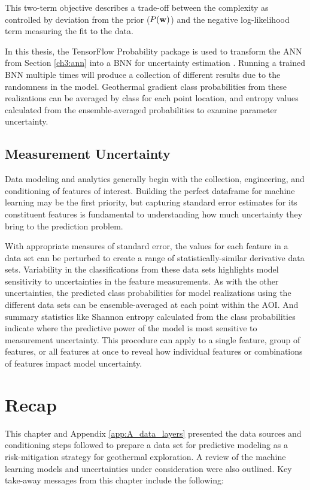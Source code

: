 This two-term objective describes a trade-off between the complexity as controlled by deviation from the prior ($P({\bf w})$) and the negative log-likelihood term measuring the fit to the data.

In this thesis, the TensorFlow Probability package is used to transform the ANN from Section \ref{ch3:ann} into a BNN for uncertainty estimation \citep{dillon_tensorflow_2017}. Running a trained BNN multiple times will produce a collection of different results due to the randomness in the model. Geothermal gradient class probabilities from these realizations can be averaged by class for each point location, and entropy values calculated from the ensemble-averaged probabilities to examine parameter uncertainty.

\subsection{Measurement Uncertainty}\label{ch3:measure_uncertainty}
Data modeling and analytics generally begin with the collection, engineering, and conditioning of features of interest. Building the perfect dataframe for machine learning may be the first priority, but capturing standard error estimates for its constituent features is fundamental to understanding how much uncertainty they bring to the prediction problem.

With appropriate measures of standard error, the values for each feature in a data set can be perturbed to create a range of statistically-similar derivative data sets. Variability in the classifications from these data sets highlights model sensitivity to uncertainties in the feature measurements. As with the other uncertainties, the predicted class probabilities for model realizations using the different data sets can be ensemble-averaged at each point within the AOI. And summary statistics like Shannon entropy calculated from the class probabilities indicate where the predictive power of the model is most sensitive to measurement uncertainty. This procedure can apply to a single feature, group of features, or all features at once to reveal how individual features or combinations of features impact model uncertainty.
\vfill
\section{Recap}\label{ch3:recap}
This chapter and Appendix \ref{app:A_data_layers} presented the data sources and conditioning steps followed to prepare a data set for predictive modeling as a risk-mitigation strategy for geothermal exploration. A review of the machine learning models and uncertainties under consideration were also outlined. Key take-away messages from this chapter include the following:

